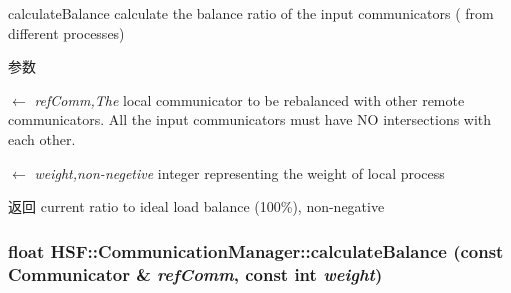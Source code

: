 calculateBalance calculate the balance ratio of the input communicators ( from different processes) 
\begin{DoxyParams}{参数}
\item[\mbox{$\leftarrow$} {\em refComm,The}]local communicator to be rebalanced with other remote communicators. All the input communicators must have NO intersections with each other. \item[\mbox{$\leftarrow$} {\em weight,non-\/negetive}]integer representing the weight of local process \end{DoxyParams}
\begin{DoxyReturn}{返回}
current ratio to ideal load balance (100\%), non-\/negative 
\end{DoxyReturn}
\hypertarget{classHSF_1_1CommunicationManager_ab75085b2af7df54a2a7991056f1b2932}{
\subsubsection[{calculateBalance}]{\setlength{\rightskip}{0pt plus 5cm}float HSF::CommunicationManager::calculateBalance (const {\bf Communicator} \& {\em refComm}, \/  const int {\em weight})}}
\label{classHSF_1_1CommunicationManager_ab75085b2af7df54a2a7991056f1b2932}


